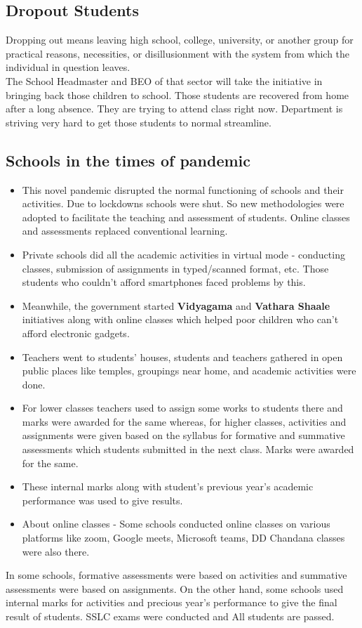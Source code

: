 \subsection{Dropout Students}
Dropping out means leaving high school, college, university, or another group for practical reasons, necessities, or disillusionment with the system from which the individual in question leaves. \\
The School Headmaster and BEO of that sector will take the initiative in bringing back those children to school. Those students are recovered from home after a long absence. They are trying to attend class right now. Department is striving very hard to get those students to normal streamline. 
\subsection{Schools in the times of pandemic}
\begin{itemize}
    \item This novel pandemic disrupted the normal functioning of schools and their activities. Due to lockdowns schools were shut. So new methodologies were adopted to facilitate the teaching and assessment of students. Online classes and assessments replaced conventional learning.
    \item Private schools did all the academic activities in virtual mode - conducting classes, submission of assignments in typed/scanned format, etc. Those students who couldn't afford smartphones faced problems by this.
    \item Meanwhile, the government started \textbf{Vidyagama} and \textbf{Vathara Shaale} initiatives along with online classes which helped poor children who can't afford electronic gadgets. 
    \item Teachers went to students' houses, students and teachers gathered in open public places like temples, groupings near home, and academic activities were done. 
    \item For lower classes teachers used to assign some works to students there and marks were awarded for the same whereas, for higher classes, activities and assignments were given based on the syllabus for formative and summative assessments which students submitted in the next class. Marks were awarded for the same.
    \item  These internal marks along with student's previous year's academic performance was used to give results. 
    \item About online classes - Some schools conducted online classes on various platforms like zoom, Google meets, Microsoft teams, DD Chandana classes were also there.
\end{itemize}

In some schools, formative assessments were based on activities and summative assessments were based on assignments. On the other hand, some schools used internal marks for activities and precious year's performance to give the final result of students. SSLC exams were conducted and All students are passed. 